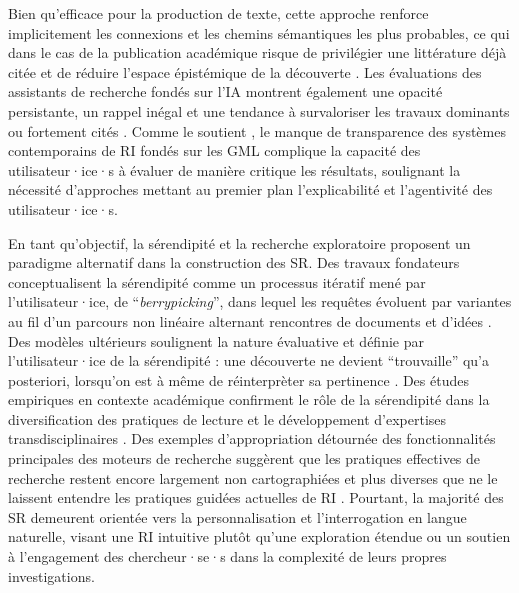 \documentclass[final,fra]{anthology-ch} %
\begin{document}
Bien qu'efficace pour la production de texte, cette approche renforce
implicitement les connexions et les chemins sémantiques les plus
probables, ce qui dans le cas de la publication académique risque de
privilégier une littérature déjà citée et de réduire l'espace
épistémique de la découverte
\autocite{nielsenGlobalCitationInequality2021,vargaNarrowingLiteratureUse2022}.
Les évaluations des assistants de recherche fondés sur l'IA montrent
également une opacité persistante, un rappel inégal et une tendance à
survaloriser les travaux dominants ou fortement cités
\autocite{pattersonWhichAITools2025,archambaultEvaluationCuttingEdgeAI2024}.
Comme le soutient
\autocite{tayReproducibilityInterpretabilityAcademic2025}, le manque de
transparence des systèmes contemporains de RI fondés sur les GML
complique la capacité des utilisateur·ice·s à évaluer de manière
critique les résultats, soulignant la nécessité d'approches mettant au
premier plan l'explicabilité et l'agentivité des utilisateur·ice·s.

En tant qu'objectif, la sérendipité et la recherche exploratoire
proposent un paradigme alternatif dans la construction des SR. Des
travaux fondateurs conceptualisent la sérendipité comme un processus
itératif mené par l'utilisateur·ice, de ``\emph{berrypicking}'', dans
lequel les requêtes évoluent par variantes au fil d'un parcours non
linéaire alternant rencontres de documents et d'idées
\autocite{batesDesignBrowsingBerrypicking1989,erdelezInformationEncounteringIts1999}.
Des modèles ultérieurs soulignent la nature évaluative et définie par
l'utilisateur·ice de la sérendipité : une découverte ne devient
``trouvaille'' qu'a posteriori, lorsqu'on est à même de réinterprèter sa
pertinence
\autocite{makriComingInformationSerendipitously2012}.
Des études empiriques en contexte académique confirment le rôle de la
sérendipité dans la diversification des pratiques de lecture et le
développement d'expertises transdisciplinaires
\autocite{fosterSerendipityInformationSeeking2003}. Des exemples
d'appropriation détournée des fonctionnalités principales des moteurs de
recherche suggèrent que les pratiques effectives de recherche restent
encore largement non cartographiées et plus diverses que ne le laissent
entendre les pratiques guidées actuelles de RI
\autocite{dumasprimbaultNaviguerDansSavoirs2023}. Pourtant, la majorité
des SR demeurent orientée vers la personnalisation et l'interrogation en
langue naturelle, visant une RI intuitive plutôt qu'une exploration
étendue ou un soutien à l'engagement des chercheur·se·s dans la
complexité de leurs propres investigations.
\end{document}
